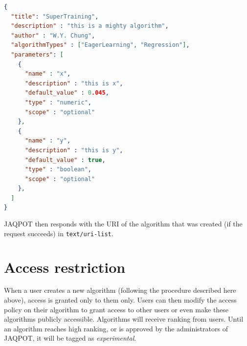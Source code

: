 \begin{lstlisting}[language=json]
{
  "title": "SuperTraining",
  "description" : "this is a mighty algorithm",
  "author" : "W.Y. Chung",
  "algorithmTypes" : ["EagerLearning", "Regression"],
  "parameters": [
    {
      "name" : "x",
      "description" : "this is x",
      "default_value" : 0.045,
      "type" : "numeric",
      "scope" : "optional"
    },
    {
      "name" : "y",
      "description" : "this is y",
      "default_value" : true,
      "type" : "boolean",
      "scope" : "optional"
    },
  ]
} 
\end{lstlisting}

JAQPOT then responds with the URI of the algorithm that 
was created (if the request succeeds) in \texttt{text/uri-list}.

\section{Access restriction}
When a user creates a new algorithm (following the procedure described here
above), access is granted only to them only. Users can then modify the access
policy on their algorithm to grant access to other users or even make 
these algorithms publicly accessible. Algorithms will receive ranking
from users. Until an algorithm reaches high ranking, or is approved by
the administrators of JAQPOT, it will be tagged as \textit{experimental}.